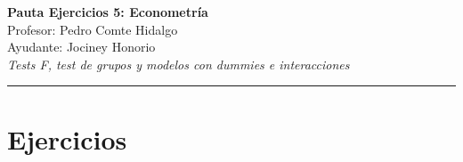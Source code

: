 \documentclass[11pt,a4paper]{article}
\begin{document}
\begin{center}
    {\Large \textbf{Pauta Ejercicios 5: Econometría}}\\[0.3cm]
    Profesor: Pedro Comte Hidalgo \\
    Ayudante: Jociney Honorio \\
    \textit{Tests F, test de grupos y modelos con dummies e interacciones}
\end{center}

\vspace{0.3cm}
\hrule
\vspace{0.5cm}

\section{Ejercicios}
\end{document}
